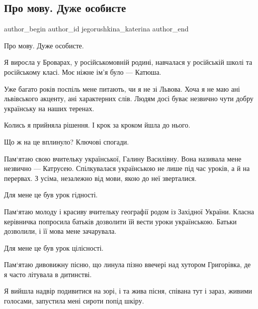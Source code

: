  
 
 
 
 
 
\subsection{Про мову. Дуже особисте}
\label{sec:14_09_2021.fb.jegorushkina_katerina.1.mova_osobyste}
 
\ifcmt
 author_begin
   author_id jegorushkina_katerina
 author_end
\fi

Про мову. Дуже особисте.

Я виросла у Броварах, у російськомовній родині, навчалася у російській школі та
російському класі. Моє ніжне ім’я було — Катюша.

Уже багато років поспіль мене питають, чи я не зі Львова. Хоча я не маю ані
львівського акценту, ані характерних слів. Людям досі буває незвично чути добру
українську на наших теренах.

Колись я прийняла рішення. І крок за кроком йшла до нього.

Що ж на це вплинуло? Ключові спогади.

Пам‘ятаю свою вчительку української, Галину Василівну. Вона називала мене
незвично — Катрусею. Спілкувалася українською не лише під час уроків, а й на
перервах. З усіма, незалежно від мови, якою до неї зверталися. 

Для мене це був урок гідності.

Пам‘ятаю молоду і красиву вчительку географії родом із Західної України. Класна
керівничка попросила батьків дозволити їй вести уроки українською. Батьки
дозволили, і її  мова мене зачарувала.

Для мене це був урок цілісності.

Пам‘ятаю дивовижну пісню, що линула пізно ввечері над хутором Григорівка, де я
часто літувала в дитинстві.

Я вийшла надвір подивитися на зорі, і та жива пісня, співана тут і зараз,
живими голосами, запустила мені сироти попід шкіру.

